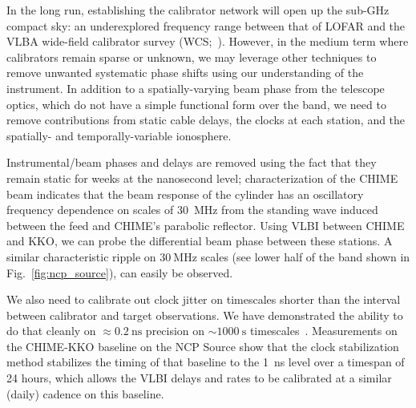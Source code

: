 In the long run, establishing the calibrator network will open up the sub-GHz compact sky: an underexplored frequency range between that of LOFAR and the VLBA wide-field calibrator survey (WCS;~\citep{petrov2021wide}). However, in the medium term where calibrators remain sparse or unknown, we may leverage other techniques to remove unwanted systematic phase shifts using our understanding of the instrument. In addition to a spatially-varying beam phase from the telescope optics, which do not have a simple functional form over the band, we need to remove contributions from static cable delays, the clocks at each station, and the spatially- and temporally-variable ionosphere.

Instrumental/beam phases and delays are removed using the fact that they remain static for weeks at the nanosecond level; characterization of the CHIME beam indicates that the beam response of the cylinder has an oscillatory frequency dependence on scales of \SI{30}{\mega\hertz} from the standing wave induced between the feed and CHIME's parabolic reflector. Using VLBI between CHIME and KKO, we can probe the differential beam phase between these stations. A similar characteristic ripple on
$\SI{30}{\mega\hertz}$ scales (see lower half of the band shown in Fig.~\ref{fig:ncp_source}), can easily be observed.

We also need to calibrate out clock jitter on timescales shorter than the interval between calibrator and target observations. We have demonstrated the ability to do that cleanly on $\approx \SI{0.2}{\nano\second}$ precision on $\sim \SI{1000}{\second}$ timescales~\citep{cary2021evaluating,mena_parra2022clock}. Measurements on the CHIME-KKO baseline on the NCP Source show that the clock stabilization method stabilizes the
timing of that baseline to the \SI{1}{\nano\second} level over a timespan of 24 hours, which allows the VLBI delays and rates to be calibrated at a similar (daily) cadence on this baseline. 

